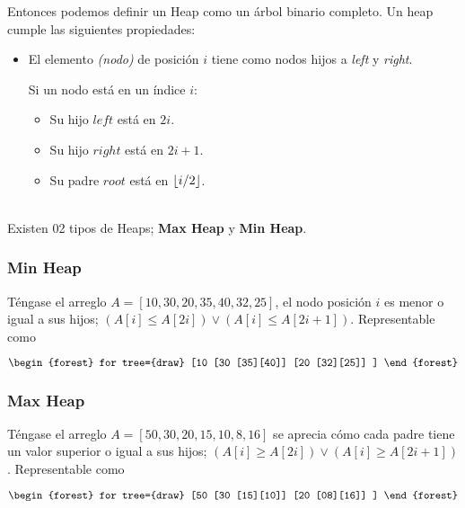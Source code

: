 \documentclass[tikz,11pt,fleqn]{book} %
\begin{document}
Entonces podemos definir un Heap como un árbol binario completo. 
Un heap cumple las siguientes propiedades:
\begin{itemize}
    \item El elemento \textit{(nodo)} de posición $i$ tiene como nodos hijos a \textit{left} y \textit{right}.

    Si un nodo está en un índice $i$:
    \begin{itemize}
        \item Su hijo $left$ está en $2i$.
        \item Su hijo $right$ está en $2i+1$.
        \item Su padre $root$ está en $\left\lfloor i/2 \right\rfloor$.
    \end{itemize}
\end{itemize}~\\
Existen 02 tipos de Heaps; \textbf{Max Heap} y \textbf{Min Heap}.

\subsubsection{Min Heap}
Téngase el arreglo $A=[10,30,20,35,40,32,25]$, el nodo posición $i$ es menor o igual a sus hijos; $(A[i] \le A[2i]) \lor (A[i] \le A[2i+1])$. Representable como

$$\begin{forest}
for tree={draw}
    [10
        [30
            [35][40]]
        [20
            [32][25]]
    ]
\end{forest}$$

\subsubsection{Max Heap}
Téngase el arreglo $A=[50,30,20,15,10,8,16]$ se aprecia cómo cada padre tiene un valor superior o igual a sus hijos; $(A[i] \ge A[2i]) \lor (A[i] \ge A[2i+1])$. Representable como

$$\begin{forest}
for tree={draw}
    [50
        [30
            [15][10]]
        [20
            [08][16]]
    ]
\end{forest}$$
\end{document}
